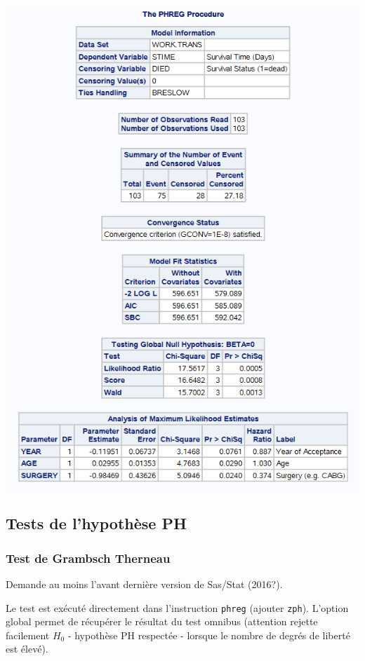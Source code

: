 \documentclass[
  12pt,
  letterpaper,
  DIV=11,
  numbers=noendperiod,
  onepage,
  openany]{scrreprt}
\begin{document}
\includegraphics{sas/5a.PNG}

\hypertarget{tests-de-lhypothuxe8se-ph}{%
\subsection{Tests de l'hypothèse PH}\label{tests-de-lhypothuxe8se-ph}}

\hypertarget{test-de-grambsch-therneau}{%
\subsubsection{Test de Grambsch
Therneau}\label{test-de-grambsch-therneau}}

Demande au moins l'avant dernière version de Sas/Stat (2016?).

Le test est exécuté directement dans l'instruction \texttt{phreg}
(ajouter \texttt{zph}). L'option global permet de récupérer le résultat
du test omnibus (attention rejette facilement \(H_0\) - hypothèse PH
respectée - lorsque le nombre de degrés de liberté est élevé).
\end{document}
